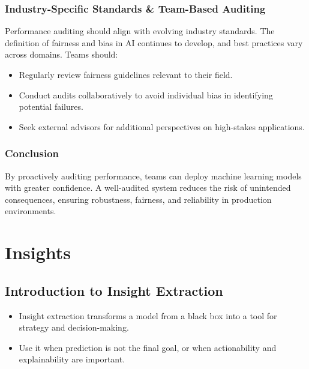 \documentclass[12pt,openany, draft]{book}
\begin{document}
\section{Industry-Specific Standards \& Team-Based Auditing}
Performance auditing should align with evolving industry standards. The definition of fairness and bias in AI continues to develop, and best practices vary across domains. Teams should:
\begin{itemize}
    \item Regularly review fairness guidelines relevant to their field.
    \item Conduct audits collaboratively to avoid individual bias in identifying potential failures.
    \item Seek external advisors for additional perspectives on high-stakes applications.
\end{itemize}

\section{Conclusion}
By proactively auditing performance, teams can deploy machine learning models with greater confidence. A well-audited system reduces the risk of unintended consequences, ensuring robustness, fairness, and reliability in production environments.





\part{Insights}




\chapter{Introduction to Insight Extraction}

\begin{summarybox}
\begin{itemize}
  \item Insight extraction transforms a model from a black box into a tool for strategy and decision-making.
  \item Use it when prediction is not the final goal, or when actionability and explainability are important.
\end{itemize}
\end{summarybox}
\end{document}
